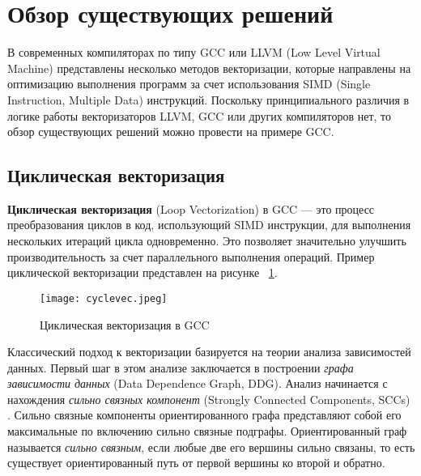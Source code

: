 \section{Обзор существующих решений}
\label{sec:Chapter2} 


В современных компиляторах по типу GCC или LLVM (Low Level Virtual Machine) представлены несколько методов векторизации, которые направлены на оптимизацию выполнения программ за счет использования SIMD (Single Instruction, Multiple Data) инструкций. Поскольку принципиального различия в логике работы векторизаторов LLVM, GCC или других компиляторов нет, то обзор существующих решений можно провести на примере GCC.

\subsection{Циклическая векторизация}

\textbf{Циклическая векторизация} (Loop Vectorization) в GCC — это процесс преобразования циклов в код, использующий SIMD инструкции, для выполнения нескольких итераций цикла одновременно. Это позволяет значительно улучшить производительность за счет параллельного выполнения операций. Пример циклической векторизации представлен на рисунке ~\ref{cyclevec}.

\begin{figure}[!htb]
    \centering
    \texttt{[image: cyclevec.jpeg]}\\
    \caption{Циклическая векторизация в GCC}
    \label{cyclevec}
\end{figure}

Классический подход к векторизации базируется на теории анализа зависимостей данных. Первый шаг в этом анализе заключается в построении \textit{графа зависимости данных} (Data Dependence Graph, DDG). Анализ начинается с нахождения \textit{сильно связных компонент} (Strongly Connected Components, SCCs) \cite{liang2017vectorization}. Сильно связные компоненты ориентированного графа представляют собой его максимальные по включению сильно связные подграфы. Ориентированный граф называется \textit{сильно связным}, если любые две его вершины сильно связаны, то есть существует ориентированный путь от первой вершины ко второй и обратно.


